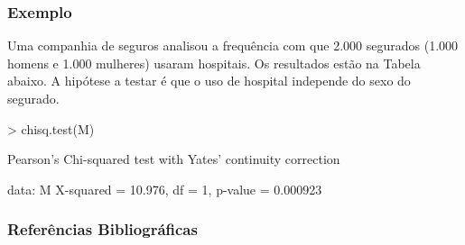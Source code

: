 \documentclass[14pt,aspectratio=1610]{beamer}
\begin{document}
\begin{frame}[fragile]{}
\frametitle{Exemplo}
\begin{block}{}
\justifying
Uma companhia de seguros analisou a frequência com que 2.000 segurados (1.000 homens e 1.000 mulheres) usaram hospitais. Os resultados estão na Tabela abaixo. A hipótese a testar é que o uso de hospital independe do sexo do segurado.
\begin{Schunk}
\begin{Sinput}
> chisq.test(M)
\end{Sinput}
\begin{Soutput}
	Pearson's Chi-squared test with Yates' continuity correction

data:  M
X-squared = 10.976, df = 1, p-value = 0.000923
\end{Soutput}
\end{Schunk}
\end{block}
\end{frame}

\begin{frame}{}
\frametitle{Referências Bibliográficas}

\end{frame}
\end{document}
